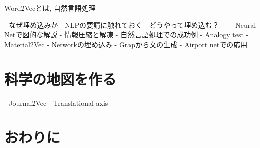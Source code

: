 \documentclass[J]{scitrans}
\begin{document}
Word2Vecとは, 自然言語処理



- なぜ埋め込みか
    - NLPの要請に触れておく
- どうやって埋め込む？
　  - Neural Netで図的な解説
    - 情報圧縮と解凍
- 自然言語処理での成功例
    - Analogy test
    - Material2Vec
- Networkの埋め込み
    - Grapから文の生成
- Airport netでの応用

\section{科学の地図を作る}

- Journal2Vec
- Translational axis




\section{おわりに}


\acknowledgement





\end{document}
